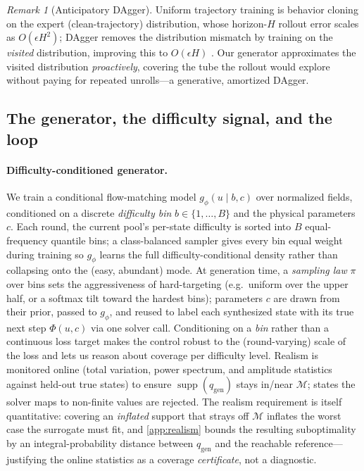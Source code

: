 \documentclass{article}
\theoremstyle{plain}
\theoremstyle{definition}
\theoremstyle{remark}
\newtheorem{remark}{Remark}
\DeclareMathOperator{\supp}{supp}
\newcommand{\state}{u}
\newcommand{\param}{c}
\newcommand{\manifold}{\mathcal{M}}
\newcommand{\sol}{\Phi}
\newcommand{\qgen}{q_{\mathrm{gen}}}
\begin{document}
\begin{remark}[Anticipatory DAgger]\label{rem:dagger}
Uniform trajectory training is behavior cloning on the expert (clean-trajectory) distribution, whose
horizon-$H$ rollout error scales as $O(\epsilon H^2)$; DAgger removes the distribution mismatch by
training on the \emph{visited} distribution, improving this to $O(\epsilon H)$ \citep{ross2011dagger}.
Our generator approximates the visited distribution \emph{proactively}, covering the tube the rollout
would explore without paying for repeated unrolls---a generative, amortized DAgger.
\end{remark}

\subsection{The generator, the difficulty signal, and the loop}\label{sec:method-gen}
\paragraph{Difficulty-conditioned generator.}
We train a conditional flow-matching model \citep{lipman2023flow} $g_\phi(\state\mid b,\param)$ over
normalized fields, conditioned on a discrete \emph{difficulty bin} $b\in\{1,\dots,B\}$ and the physical
parameters $\param$. Each round, the current pool's per-state difficulty is sorted into $B$
equal-frequency quantile bins; a class-balanced sampler gives every bin equal weight during training so
$g_\phi$ learns the full difficulty-conditional density rather than collapsing onto the (easy, abundant)
mode. At generation time, a \emph{sampling law} $\pi$ over bins sets the aggressiveness of hard-targeting
(e.g.\ uniform over the upper half, or a softmax tilt toward the hardest bins); parameters $\param$ are
drawn from their prior, passed to $g_\phi$, and reused to label each synthesized state with its true next
step $\sol(\state,\param)$ via one solver call. Conditioning on a \emph{bin} rather than a continuous
loss target makes the control robust to the (round-varying) scale of the loss and lets us reason about
coverage per difficulty level. Realism is monitored online (total variation, power spectrum, and
amplitude statistics against held-out true states) to ensure $\supp(\qgen)$ stays in/near
$\manifold$; states the solver maps to non-finite values are rejected. The realism requirement is itself
quantitative: covering an \emph{inflated} support that strays off $\manifold$ inflates the worst case the
surrogate must fit, and \cref{app:realism} bounds the resulting suboptimality by an integral-probability
distance between $\qgen$ and the reachable reference---justifying the online statistics as a coverage
\emph{certificate}, not a diagnostic.
\end{document}
